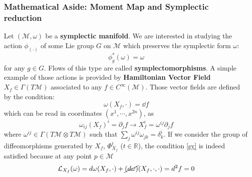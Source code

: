 \documentclass[11pt]{article}
\theoremstyle{definition}
\numberwithin{equation}{section}
\begin{document}
\subsubsection{Mathematical Aside: Moment Map and Symplectic reduction}
Let $(\mathcal{M}, \omega)$ be a \textbf{symplectic manifold}. We are interested in studying the action $\phi_{(\cdot)}$ of some Lie group $G$ on $\mathcal{M}$ which preserves the symplectic form $\omega$:
\begin{equation}
	\label{sy}
    \phi_g^*(\omega) = \omega
\end{equation}
for any $g \in G$. Flows of this type are called \textbf{symplectomorphisms}. A simple example of those actions is provided by \textbf{Hamiltonian Vector Field} $X_f \in \Gamma(T \mathcal{M})$ associated to any $f \in C^{\infty}(\mathcal{M})$. Those vector fields are defined by the condition:
\begin{equation}
    \omega(X_f,\cdot) = \dd f
\end{equation}
which can be read in coordinates $(x^1,\cdots,x^{2n})$, as
\begin{equation}
    \omega_{ij} (X_f)^i = \partial_j f \to X_f^i = \omega^{ij} \partial_j f 
\end{equation}
where $\omega^{ij} \in \Gamma(T \mathcal{M} \otimes T \mathcal{M} )$ such that $\sum_j \omega^{ij} \omega_{jk} = \delta^{i}_k$. If we consider the group of diffeomorphisms generated by $X_f$, $\Phi_{X_f}^t$ ($t \in \mathbb{R}$), the condition \eqref{sy} is indeed satisfied because at any point $p \in \mathcal{M}$
\begin{equation}
   \mathcal{L}_{X_f} (\omega) = d \omega(X_f, \cdot) +  \cancel{(d \omega)}(X_f, \cdot , \cdot) = d^2 f =0
\end{equation}
\end{document}
